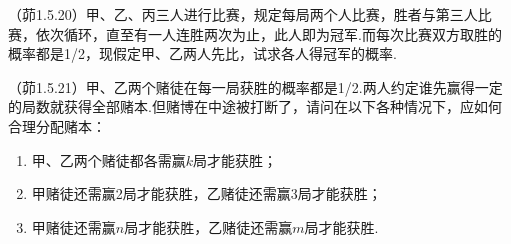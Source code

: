 \begin{problemset}[错题记录]
    \item （茆1.5.20）甲、乙、丙三人进行比赛，规定每局两个人比赛，胜者与第三人比赛，依次循环，直至有一人连胜两次为止，此人即为冠军.而每次比赛双方取胜的概率都是1/2，现假定甲、乙两人先比，试求各人得冠军的概率.
    \item （茆1.5.21）甲、乙两个赌徒在每一局获胜的概率都是1/2.两人约定谁先赢得一定的局数就获得全部赌本.但赌博在中途被打断了，请问在以下各种情况下，应如何合理分配赌本：
    \begin{enumerate}
      \item 甲、乙两个赌徒都各需赢$k$局才能获胜；
      \item 甲赌徒还需赢2局才能获胜，乙赌徒还需赢3局才能获胜；
      \item 甲赌徒还需赢$n$局才能获胜，乙赌徒还需赢$m$局才能获胜.
    \end{enumerate}
\end{problemset}
